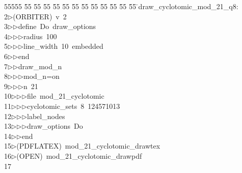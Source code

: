 %
%
\begin{tabbing}
55555 \= 55 \= 55 \= 55 \= 55 \= 55 \= 55 \= 55 \= 55 \= 55 \= 55 \= 55 \= 55 \= \>draw\_cyclotomic\_mod\_21\_q8:\\[0pt]
2\>$\triangleright$\>(ORBITER)\ v\ 2\ \\[0pt]
3\>$\triangleright$\>$\triangleright$\>define\ Do\ draw\_options\ \\[0pt]
4\>$\triangleright$\>$\triangleright$\>$\triangleright$\>radius\ 100\ \\[0pt]
5\>$\triangleright$\>$\triangleright$\>$\triangleright$\>line\_width\ 10\ embedded\ \\[0pt]
6\>$\triangleright$\>$\triangleright$\>end\ \\[0pt]
7\>$\triangleright$\>$\triangleright$\>draw\_mod\_n\ \\[0pt]
8\>$\triangleright$\>$\triangleright$\>$\triangleright$\>mod\_n=on\ \\[0pt]
9\>$\triangleright$\>$\triangleright$\>$\triangleright$\>n\ 21\ \\[0pt]
10\>$\triangleright$\>$\triangleright$\>$\triangleright$\>file\ mod\_21\_cyclotomic\ \\[0pt]
11\>$\triangleright$\>$\triangleright$\>$\triangleright$\>cyclotomic\_sets\ 8\ 124571013\ \\[0pt]
12\>$\triangleright$\>$\triangleright$\>$\triangleright$\>label\_nodes\ \\[0pt]
13\>$\triangleright$\>$\triangleright$\>$\triangleright$\>draw\_options\ Do\ \\[0pt]
14\>$\triangleright$\>$\triangleright$\>end\\[0pt]
15\>$\triangleright$\>(PDFLATEX)\ mod\_21\_cyclotomic\_drawtex\\[0pt]
16\>$\triangleright$\>(OPEN)\ mod\_21\_cyclotomic\_drawpdf\\[0pt]
17\>\end{tabbing}
